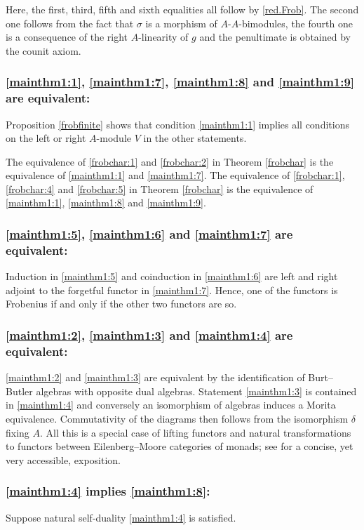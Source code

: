 \documentclass[12pt,a4paper]{amsart}
\theoremstyle{plain}
\theoremstyle{definition}
\numberwithin{equation}{thm}
\begin{document}
Here, the first,  third, fifth and sixth equalities all follow by \eqref{red.Frob}. The second one follows from the fact that $\sigma$ is a morphism of $A$-$A$-bimodules, the fourth one is a consequence of the right $A$-linearity of $g$ and the penultimate is obtained by the counit axiom.

\subsubsection{\eqref{mainthm1:1}, \eqref{mainthm1:7}, \eqref{mainthm1:8} and \eqref{mainthm1:9} are equivalent:}
Proposition \ref{frobfinite} shows that condition \eqref{mainthm1:1} implies all
conditions on the left or right $A$-module $V$ in the other statements.

The equivalence of \eqref{frobchar:1} and \eqref{frobchar:2} in Theorem \ref{frobchar} is the
equivalence of \eqref{mainthm1:1} and \eqref{mainthm1:7}. The equivalence of \eqref{frobchar:1}, \eqref{frobchar:4} and \eqref{frobchar:5} in Theorem \ref{frobchar} is the
equivalence of \eqref{mainthm1:1}, \eqref{mainthm1:8} and \eqref{mainthm1:9}. 

\subsubsection{\eqref{mainthm1:5}, \eqref{mainthm1:6} and \eqref{mainthm1:7} are equivalent:}
Induction in \eqref{mainthm1:5} and coinduction in \eqref{mainthm1:6} are left and right adjoint to the
forgetful functor in \eqref{mainthm1:7}. Hence, one of the functors is Frobenius if and
only if the other two functors are so.


\subsubsection{\eqref{mainthm1:2}, \eqref{mainthm1:3} and \eqref{mainthm1:4} are equivalent:}
\eqref{mainthm1:2} and \eqref{mainthm1:3} are equivalent by the identification of Burt--Butler algebras with opposite dual algebras.
Statement \eqref{mainthm1:3} is contained in \eqref{mainthm1:4} and conversely an isomorphism of algebras induces a
Morita equivalence. Commutativity of the diagrams then follows from the
isomorphism $\delta$ fixing $A$. All this is a special case of lifting functors and natural transformations to functors between Eilenberg--Moore categories of monads; see \cite[Chapter~2]{Boh18} for a concise, yet very accessible, exposition. 

\subsubsection{\eqref{mainthm1:4} implies \eqref{mainthm1:8}:}
Suppose natural self-duality \eqref{mainthm1:4} is satisfied. 
\end{document}
